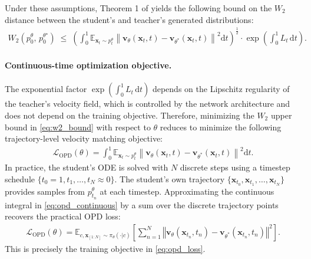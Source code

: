 \documentclass{article} %
\renewcommand{\mathbf}[1]{\bm{#1}}
\begin{document}
Under these assumptions, Theorem 1 of \citet{benton2023error} yields the following bound on the $W_2$ distance between the student's and teacher's generated distributions:
\begin{align}
    W_2(p_0^\theta, \, p_0^{\theta^\star}) \;\leq\; \left(\int_0^1 \mathbb{E}_{\mathbf{x}_t \sim p_t^{\theta}} \left\| \mathbf{v}_\theta(\mathbf{x}_t, t) - \mathbf{v}_{\theta^*}(\mathbf{x}_t, t) \right\|^2 \mathrm{d}t\right)^{\frac{1}{2}} \cdot \exp\!\left(\int_0^1 L_t \,\mathrm{d}t\right).
    \label{eq:w2_bound}
\end{align}

\paragraph{Continuous-time optimization objective.} The exponential factor $\exp\!\left(\int_0^1 L_t \,\mathrm{d}t\right)$ depends on the Lipschitz regularity of the teacher's velocity field, which is controlled by the network architecture and does not depend on the training objective. Therefore, minimizing the $W_2$ upper bound in \cref{eq:w2_bound} with respect to $\theta$ reduces to minimize the following trajectory-level velocity matching objective:
\begin{align}
   \mathcal{L}_{\text{OPD}}(\theta) = \int_0^1 \mathbb{E}_{\mathbf{x}_t \sim p_t^{\theta}} \left\| \mathbf{v}_\theta(\mathbf{x}_t, t) - \mathbf{v}_{\theta^*}(\mathbf{x}_t, t) \right\|^2 \mathrm{d}t.
    \label{eq:opd_continuous}
\end{align}
In practice, the student's ODE is solved with $N$ discrete steps using a timestep schedule $\{t_0 = 1, t_1, \ldots, t_N \approx 0\}$. The student's own trajectory $\{\mathbf{x}_{t_0}, \mathbf{x}_{t_1}, \ldots, \mathbf{x}_{t_N}\}$ provides samples from $p_{t_n}^\theta$ at each timestep. Approximating the continuous integral in \cref{eq:opd_continuous} by a sum over the discrete trajectory points recovers the practical OPD loss:
\begin{align}
    \mathcal{L}_{\text{OPD}}(\theta) = \mathbb{E}_{c,\mathbf{x}_{[1:N]}\sim \pi_\theta(\cdot|c)}\left[\sum_{n =1}^N \left\Vert \mathbf{v}_\theta(\mathbf{x}_{t_n}, t_n) - \mathbf{v}_{\theta^*}(\mathbf{x}_{t_n}, t_n) \right\Vert^2\right].
\end{align}
This is precisely the training objective in \cref{eq:opd_loss}.




\end{document}
